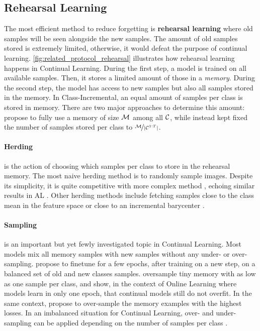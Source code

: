 \subsection{Rehearsal Learning}
\label{sec:related_rehearsal}

The most efficient method to reduce forgetting is \textbf{rehearsal learning} where old samples will
be seen alongside the new samples. The amount of old samples stored is extremely limited, otherwise,
it would defeat the purpose of continual learning. \autoref{fig:related_protocol_rehearsal} illustrates how
rehearsal learning happens in Continual Learning. During the first step, a model is trained on all
available samples. Then, it stores a limited amount of those in a \textit{memory}. During the second
step, the model has access to new samples but also all samples stored in the memory. In
Class-Incremental, an equal amount of samples per class is stored in memory. There are
two major approaches to determine this amount: \cite{rebuffi2017icarl} propose to fully use a
memory of size $\mathcal{M}$ among all $\mathcal{C}$, while \cite{hou2019ucir} instead kept fixed the number of
samples stored per class to $\nicefrac{\mathcal{M}}{|\mathcal{C}^{1:T}|}$.

\paragraph{Herding} is the action of choosing which samples per class to store in the rehearsal
memory. The most naive herding method is to randomly sample images. Despite its simplicity, it is
quite competitive with more complex method \citep{castro2018end_to_end_inc_learn}, echoing similar
results in \ac{AL} \citep{gal2017activelearning}. Other herding methods include fetching samples
close to the class mean in the feature space \citep{castro2018end_to_end_inc_learn} or close to an
incremental barycenter \citep{rebuffi2017icarl}.

\paragraph{Sampling} is an important but yet fewly investigated topic in Continual Learning. Most
models mix all memory samples with new samples without any under- or over-sampling.
\cite{castro2018end_to_end_inc_learn} propose to finetune for a few epochs, after training on a new
step, on a balanced set of old and new classes samples. \cite{chaudhry2019tinyepisodicmemories}
oversample tiny memory with as low as one sample per class, and show, in the context of Online
Learning where models learn in only one epoch, that continual models still do not overfit. In the
same context, \cite{aljundi2019maximallyinterfered} propose to over-sample the memory examples with
the highest losses. In an imbalanced situation for Continual Learning, over- and under-sampling can be
applied depending on the number of samples per class \citep{kim2020imbalancedcontinual}.

